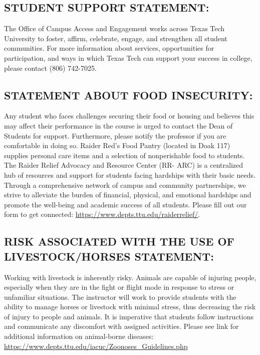 \documentclass[12pt]{article}
\begin{document}
 
\subsection*{STUDENT SUPPORT STATEMENT:}

The Office of Campus Access and Engagement works across Texas Tech University to foster, affirm, celebrate, engage, and strengthen all student communities. For more information about services, opportunities for participation, and ways in which Texas Tech can support your success in college, please contact (806) 742-7025.

 
\subsection*{STATEMENT ABOUT FOOD INSECURITY:}

Any student who faces challenges securing their food or housing and believes this may affect their performance in the course is urged to contact the Dean of Students for support. Furthermore, please notify the professor if you are comfortable in doing so. Raider Red's Food Pantry (located in Doak 117) supplies personal care items and a selection of nonperishable food to students. The Raider Relief Advocacy and Resource Center (RR- ARC) is a centralized hub of resources and support for students facing hardships with their basic needs. Through a comprehensive network of campus and community partnerships, we strive to alleviate the burden of financial, physical, and emotional hardships and promote the well-being and academic success of all students. Please fill out our form to get connected: \url{https://www.depts.ttu.edu/raiderrelief/}.

 
\subsection*{RISK ASSOCIATED WITH THE USE OF LIVESTOCK/HORSES STATEMENT:}

Working with livestock is inherently risky. Animals are capable of injuring people, especially when they are in the fight or flight mode in response to stress or unfamiliar situations. The instructor will work to provide students with the ability to manage horses or livestock with minimal stress, thus decreasing the risk of injury to people and animals. It is imperative that students follow instructions and communicate any discomfort with assigned activities. Please see link for additional information on animal-borne diseases: \url{https://www.depts.ttu.edu/iacuc/Zoonoses_Guidelines.php}
\end{document}
